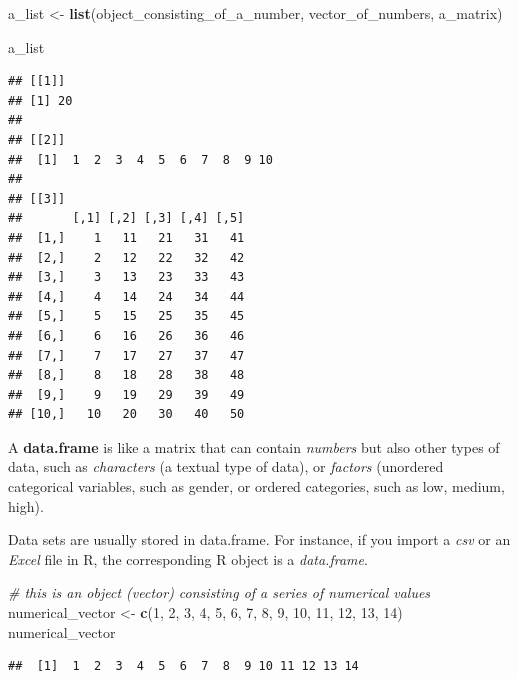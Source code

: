 \documentclass[
]{article}
\newenvironment{Shaded}{\begin{snugshade}}{\end{snugshade}}
\newcommand{\CommentTok}[1]{\textcolor[rgb]{0.56,0.35,0.01}{\textit{#1}}}
\newcommand{\DecValTok}[1]{\textcolor[rgb]{0.00,0.00,0.81}{#1}}
\newcommand{\KeywordTok}[1]{\textcolor[rgb]{0.13,0.29,0.53}{\textbf{#1}}}
\newcommand{\NormalTok}[1]{#1}
\newcommand{\StringTok}[1]{\textcolor[rgb]{0.31,0.60,0.02}{#1}}
\begin{document}
\begin{Shaded}
\begin{Highlighting}[]
\NormalTok{a_list <-}\StringTok{ }\KeywordTok{list}\NormalTok{(object_consisting_of_a_number, vector_of_numbers, a_matrix)}

\NormalTok{a_list}
\end{Highlighting}
\end{Shaded}

\begin{verbatim}
## [[1]]
## [1] 20
## 
## [[2]]
##  [1]  1  2  3  4  5  6  7  8  9 10
## 
## [[3]]
##       [,1] [,2] [,3] [,4] [,5]
##  [1,]    1   11   21   31   41
##  [2,]    2   12   22   32   42
##  [3,]    3   13   23   33   43
##  [4,]    4   14   24   34   44
##  [5,]    5   15   25   35   45
##  [6,]    6   16   26   36   46
##  [7,]    7   17   27   37   47
##  [8,]    8   18   28   38   48
##  [9,]    9   19   29   39   49
## [10,]   10   20   30   40   50
\end{verbatim}

A \textbf{data.frame} is like a matrix that can contain \emph{numbers} but also other types of data, such as \emph{characters} (a textual type of data), or \emph{factors} (unordered categorical variables, such as gender, or ordered categories, such as low, medium, high).

Data sets are usually stored in data.frame. For instance, if you import a \emph{csv} or an \emph{Excel} file in R, the corresponding R object is a \emph{data.frame}.

\begin{Shaded}
\begin{Highlighting}[]
\CommentTok{# this is an object (vector) consisting of a series of numerical values}
\NormalTok{numerical_vector <-}\StringTok{ }\KeywordTok{c}\NormalTok{(}\DecValTok{1}\NormalTok{, }\DecValTok{2}\NormalTok{, }\DecValTok{3}\NormalTok{, }\DecValTok{4}\NormalTok{, }\DecValTok{5}\NormalTok{, }\DecValTok{6}\NormalTok{, }\DecValTok{7}\NormalTok{, }\DecValTok{8}\NormalTok{, }\DecValTok{9}\NormalTok{, }\DecValTok{10}\NormalTok{, }\DecValTok{11}\NormalTok{, }\DecValTok{12}\NormalTok{, }\DecValTok{13}\NormalTok{, }\DecValTok{14}\NormalTok{)}
\NormalTok{numerical_vector}
\end{Highlighting}
\end{Shaded}

\begin{verbatim}
##  [1]  1  2  3  4  5  6  7  8  9 10 11 12 13 14
\end{verbatim}
\end{document}
